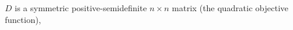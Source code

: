 \item $D$ is a symmetric positive-semidefinite $n\times n$ matrix (the
  quadratic objective function),
